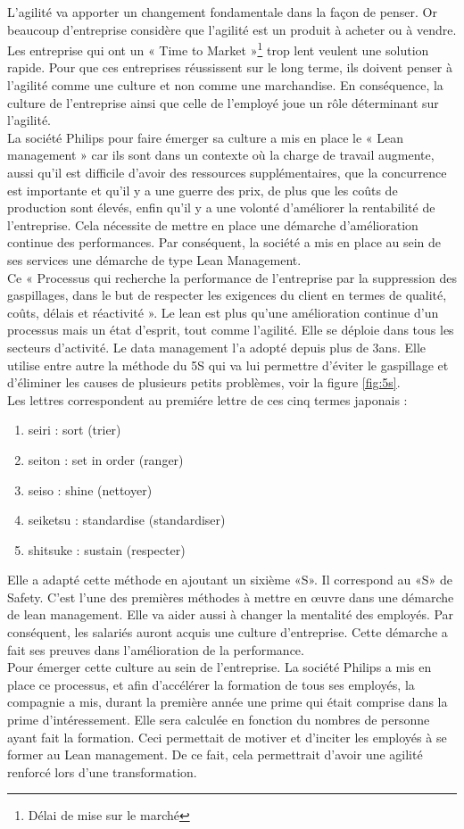 \documentclass[12pt,a4paper]{article}
\begin{document}
L'agilité va apporter un changement fondamentale dans la façon de penser. Or beaucoup d'entreprise considère que l'agilité est un produit à acheter ou à vendre. Les entreprise qui ont un « Time to Market »\footnote{Délai de mise sur le marché} trop lent veulent une solution rapide. Pour que ces entreprises réussissent sur le long terme, ils doivent penser à l'agilité comme une culture et non comme une marchandise. En conséquence, la culture de l'entreprise ainsi que celle de l'employé joue un rôle déterminant sur l'agilité.\\
La société Philips pour faire émerger sa culture a mis en place le « Lean management » car ils sont dans un contexte où la charge de travail augmente, aussi qu'il est difficile d’avoir des ressources supplémentaires, que la concurrence est importante et qu'il y a une guerre des prix, de plus que les coûts de production sont élevés, enfin qu'il y a une volonté d’améliorer la rentabilité de l’entreprise. Cela nécessite de mettre en place une démarche d’amélioration continue des performances. Par conséquent, la société a mis en place au sein de ses services une démarche de type Lean Management.\\
Ce « Processus qui recherche la performance de l’entreprise par la suppression des gaspillages, dans le but de respecter les exigences du client en termes de qualité, coûts, délais et réactivité ».  Le lean est plus qu’une amélioration continue d’un processus mais un état d’esprit, tout comme l'agilité. Elle se déploie dans tous les secteurs d’activité. Le data management l'a adopté depuis plus de 3ans. Elle utilise entre autre la méthode du 5S qui va lui permettre d'éviter le gaspillage et d'éliminer les causes de plusieurs petits problèmes, voir la figure \ref{fig:5s}. \\
Les lettres correspondent au premiére lettre de ces cinq termes japonais :
\begin{enumerate}
\item seiri : sort (trier)
\item seiton : set in order (ranger)
\item seiso : shine (nettoyer)
\item seiketsu : standardise (standardiser)
\item shitsuke : sustain (respecter)
\end{enumerate}
Elle a adapté cette méthode en ajoutant un sixième «S». Il correspond au «S» de Safety. C'est l'une des premières méthodes à mettre en œuvre dans une démarche de lean management. Elle va aider aussi à changer la mentalité des employés. Par conséquent, les salariés auront acquis une culture d'entreprise. Cette démarche a fait ses preuves dans l’amélioration de la performance.\\
Pour émerger cette culture au sein de l'entreprise. La société Philips a mis en place ce processus, et afin d'accélérer la formation de tous ses employés, la compagnie a mis, durant la première année une prime qui était comprise dans la prime d'intéressement. Elle sera calculée en fonction du nombres de personne ayant fait la formation. Ceci permettait de motiver et d'inciter les employés à se former au Lean management. De ce fait, cela permettrait d'avoir une agilité renforcé lors d'une transformation.
\end{document}
